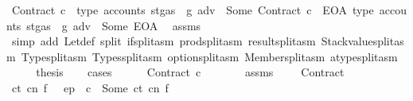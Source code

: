 \begin{isabellebody}
\ {\isacharparenleft}{\kern0pt}Contract{\isacharparenright}{\kern0pt}\ c\ \ {\isachardoublequoteopen}type\ {\isacharparenleft}{\kern0pt}accounts\ {\isacharparenleft}{\kern0pt}st{\isasymlparr}gas\ {\isacharcolon}{\kern0pt}{\isacharequal}{\kern0pt}\ g{\isacharprime}{\kern0pt}{\isasymrparr}{\isacharparenright}{\kern0pt}\ adv{\isacharparenright}{\kern0pt}\ {\isacharequal}{\kern0pt}\ Some\ {\isacharparenleft}{\kern0pt}Contract\ c{\isacharparenright}{\kern0pt}{\isachardoublequoteclose}\ {\isacharbar}{\kern0pt}\ {\isacharparenleft}{\kern0pt}EOA{\isacharparenright}{\kern0pt}\ {\isachardoublequoteopen}type\ {\isacharparenleft}{\kern0pt}accounts\ {\isacharparenleft}{\kern0pt}st{\isasymlparr}gas\ {\isacharcolon}{\kern0pt}{\isacharequal}{\kern0pt}\ g{\isacharprime}{\kern0pt}{\isasymrparr}{\isacharparenright}{\kern0pt}\ adv{\isacharparenright}{\kern0pt}\ {\isacharequal}{\kern0pt}\ Some\ EOA{\isachardoublequoteclose}\ \isamarkupfalse%
\ assms\ \isamarkupfalse%
\ {\isacharparenleft}{\kern0pt}simp\ add{\isacharcolon}{\kern0pt}\ Let{\isacharunderscore}{\kern0pt}def\ split{\isacharcolon}{\kern0pt}\ if{\isacharunderscore}{\kern0pt}split{\isacharunderscore}{\kern0pt}asm\ prod{\isachardot}{\kern0pt}split{\isacharunderscore}{\kern0pt}asm\ result{\isachardot}{\kern0pt}split{\isacharunderscore}{\kern0pt}asm\ Stackvalue{\isachardot}{\kern0pt}split{\isacharunderscore}{\kern0pt}asm\ Type{\isachardot}{\kern0pt}split{\isacharunderscore}{\kern0pt}asm\ Types{\isachardot}{\kern0pt}split{\isacharunderscore}{\kern0pt}asm\ option{\isachardot}{\kern0pt}split{\isacharunderscore}{\kern0pt}asm\ Member{\isachardot}{\kern0pt}split{\isacharunderscore}{\kern0pt}asm\ atype{\isachardot}{\kern0pt}split{\isacharunderscore}{\kern0pt}asm{\isacharparenright}{\kern0pt}\isanewline
\ \ \isamarkupfalse%
\ \isamarkupfalse%
\ {\isacharquery}{\kern0pt}thesis\isanewline
\ \ \isamarkupfalse%
\ cases\isanewline
\ \ \ \ \isamarkupfalse%
\ {\isacharparenleft}{\kern0pt}Contract\ c{\isacharparenright}{\kern0pt}\isanewline
\ \ \ \ \isamarkupfalse%
\ \isamarkupfalse%
\ assms\ {}\ {}\ {}\ {}\ Contract\ \isamarkupfalse%
\ ct\ cn\ f\ \ {}{\isacharcolon}{\kern0pt}\ {\isachardoublequoteopen}ep\ {\isachardollar}{\kern0pt}{\isachardollar}{\kern0pt}\ c\ {\isacharequal}{\kern0pt}\ Some\ {\isacharparenleft}{\kern0pt}ct{\isacharcomma}{\kern0pt}\ cn{\isacharcomma}{\kern0pt}\ f{\isacharparenright}{\kern0pt}{\isachardoublequoteclose}\ \isamarkupfalse%

\end{isabellebody}
